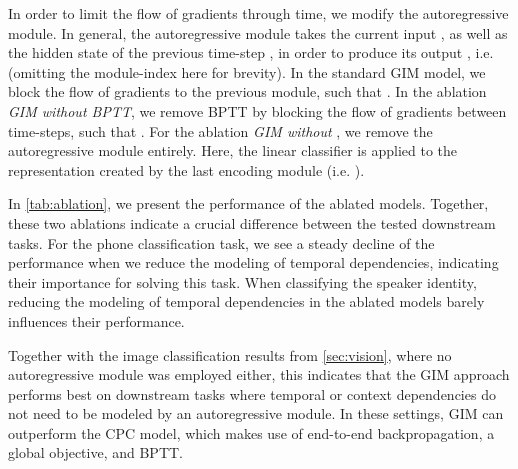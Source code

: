 \documentclass{article}
\begin{document}
In order to limit the flow of gradients through time, we modify the autoregressive module. In general, the autoregressive module  takes the current input , as well as the hidden state of the previous time-step , in order to produce its output , i.e.  (omitting the module-index  here for brevity). In the standard GIM model, we block the flow of gradients to the previous module, such that . In the ablation \textit{GIM without BPTT}, we remove BPTT by blocking the flow of gradients between time-steps, such that . For the ablation \textit{GIM without }, we remove the autoregressive module entirely. Here, the linear classifier is applied to the representation created by the last encoding module (i.e. ).

In \cref{tab:ablation}, we present the performance of the ablated models. Together, these two ablations indicate a crucial difference between the tested downstream tasks. For the phone classification task, we see a steady decline of the performance when we reduce the modeling of temporal dependencies, indicating their importance for solving this task. When classifying the speaker identity, reducing the modeling of temporal dependencies in the ablated models barely influences their performance.

Together with the image classification results from \cref{sec:vision}, where no autoregressive module was employed either, this indicates that the GIM approach performs best on downstream tasks where temporal or context dependencies do not need to be modeled by an autoregressive module. In these settings, GIM can outperform the CPC model, which makes use of end-to-end backpropagation, a global objective, and BPTT. 
\end{document}
